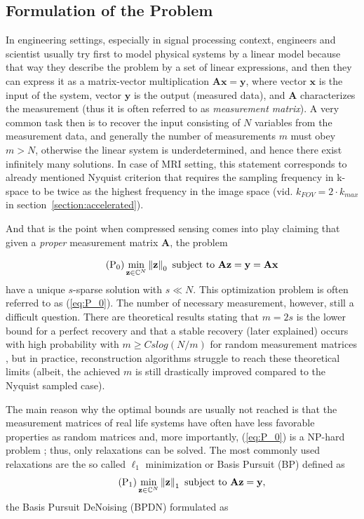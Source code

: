 \subsection{Formulation of the Problem}\label{section:problem formulation}
In engineering settings, especially in signal processing context, engineers and scientist usually try first to model physical systems by a linear model because that way they describe the problem by a set of linear expressions, and then they can express it as a matrix-vector multiplication $\mathbf{Ax} = \mathbf{y}$, where vector $\mathbf{x}$ is the input of the system, vector $\mathbf{y}$ is the output (measured data), and $\mathbf{A}$ characterizes the measurement (thus it is often referred to as \textit{measurement matrix}). A very common task then is to recover the input consisting of $N$ variables from the measurement data, and generally the number of measurements $m$ must obey $m > N$, otherwise the linear system is underdetermined, and hence there exist infinitely many solutions. In case of MRI setting, this statement corresponds to already mentioned Nyquist criterion that requires the sampling frequency in k-space to be twice as the highest frequency in the image space (vid. $k_{FOV} = 2 \cdot k_{max}$ in section~\ref{section:accelerated}).

And that is the point when compressed sensing comes into play claiming that given a \textit{proper} measurement matrix $\mathbf{A}$, the problem

\begin{equation}
    \tag{P\textsubscript{0}}\label{eq:P_0}
    \min_{\mathbf{z} \in \mathbb{C}^N} \norm{\mathbf{z}}_0 \text{ subject to } \mathbf{Az} = \mathbf{y} = \mathbf{Ax}
\end{equation}
have a unique $s$-sparse solution with $s \ll N$. This optimization problem is often referred to as (\ref{eq:P_0}). The number of necessary measurement, however, still a difficult question. There are theoretical results stating that $m = 2s$ is the lower bound for a perfect recovery \cite{damelin_miller} and that a stable recovery (later explained) occurs with high probability with $m \ge C s log(N / m)$ for random measurement matrices \cite{foucart_mathematical_2013}, but in practice, reconstruction algorithms struggle to reach these theoretical limits (albeit, the achieved $m$ is still drastically improved compared to the Nyquist sampled case).

The main reason why the optimal bounds are usually not reached is that the measurement matrices of real life systems have often have less favorable properties as random matrices and, more importantly, (\ref{eq:P_0}) is a NP-hard problem  \cite{natarajan}; thus, only relaxations can be solved. The most commonly used relaxations are the so called $\ell_1$ minimization or Basis Pursuit (BP) \cite{chen} defined as
\begin{equation}
    \tag{P\textsubscript{1}}\label{eq:P_1}
    \min_{\mathbf{z} \in \mathbb{C}^N} \norm{\mathbf{z}}_1 \text{ subject to } \mathbf{Az} = \mathbf{y},
\end{equation}
the Basis Pursuit DeNoising (BPDN) \cite{chen_donoho_saunders} formulated as

